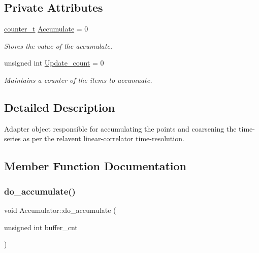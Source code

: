 \subsection*{Private Attributes}
\begin{DoxyCompactItemize}
\item 
\hyperlink{types_8hpp_a22f279793847eba127de149437848c48}{counter\+\_\+t} \hyperlink{classAccumulator_a8e615af8b85dd2c8500d1f8c473879ab}{Accumulate} = 0
\begin{DoxyCompactList}\small\item\em Stores the value of the accumulate. \end{DoxyCompactList}\item 
unsigned int \hyperlink{classAccumulator_afb010cbe82265d22e5d577033574a16b}{Update\+\_\+count} = 0
\begin{DoxyCompactList}\small\item\em Maintains a counter of the items to accumuate. \end{DoxyCompactList}\end{DoxyCompactItemize}


\subsection{Detailed Description}
Adapter object responsible for accumulating the points and coarsening the time-\/series as per the relavent linear-\/correlator time-\/resolution. 

\subsection{Member Function Documentation}
\mbox{\label{classAccumulator_adab342ee6d376a45ed38fe1e1679a1e2}} 
\subsubsection{\texorpdfstring{do\+\_\+accumulate()}{do\_accumulate()}}
{\footnotesize\ttfamily void Accumulator\+::do\+\_\+accumulate (\begin{DoxyParamCaption}\item[{unsigned int}]{buffer\+\_\+cnt }\end{DoxyParamCaption})\hspace{0.3cm}{\ttfamily [inline]}}



